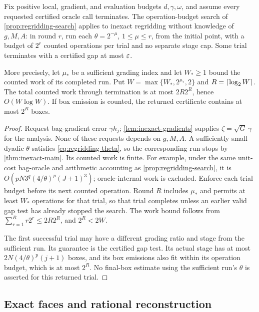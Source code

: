 \begin{corollary}
 \label{cor:inexact-search}
Fix positive local, gradient, and evaluation budgets $d,\gamma,\omega$,
and assume every requested certified oracle call terminates.  The
operation-budget search of \cref{prop:regridding-search} applies to
inexact regridding without knowledge of $g,M,A$: in round $r$, run each
$\theta=2^{-\mu}$, $1\le\mu\le r$, from the initial point, with a
budget of $2^r$ counted operations per trial and no separate stage cap.
Some trial terminates with a certified gap at most $\varepsilon$.

More precisely, let $\mu_*$ be a sufficient grading index and let
$W_*\ge1$ bound the counted work of its completed run.  Put
$W=\max\{W_*,2^{\mu_*},2\}$ and $R=\left\lceil \log_2 W\right\rceil$.
The total counted work through termination is at most $2R2^R$, hence
$O(W\log W)$.  If box emission is counted, the returned certificate
contains at most $2^R$ boxes.
\end{corollary}

\begin{proof}
Request bag-gradient error $\gamma h_j$; \cref{lem:inexact-gradients}
supplies $\zeta=\sqrt G\,\gamma$ for the analysis.  None of these
requests depends on $g,M,A$.  A sufficiently small dyadic $\theta$
satisfies \eqref{eq:regridding-theta}, so the corresponding run stops
by \cref{thm:inexact-main}.  Its counted work is finite.  For example,
under the same unit-cost bag-oracle and arithmetic accounting as
\cref{prop:regridding-search}, it is
$O(pN3^q(4/\theta)^p(J+1)^3)$; oracle-internal work is excluded.
Enforce each trial budget before its next counted operation.  Round
$R$ includes $\mu_*$ and permits at least $W_*$ operations for that
trial, so that trial completes unless an earlier valid gap test has
already stopped the search.  The work bound follows from
$\sum_{r=1}^R r2^r\le2R2^R$, and $2^R<2W$.

The first successful trial may have a different grading ratio and
stage from the sufficient run.  Its guarantee is the certified gap
test.  Its actual stage has at most
$2N(4/\theta)^p(j+1)$ boxes, and its box emissions also fit within
its operation budget, which is at most $2^R$.  No final-box estimate
using the sufficient run's $\theta$ is asserted for this returned
trial.
\end{proof}

\subsection{Exact faces and rational reconstruction}

